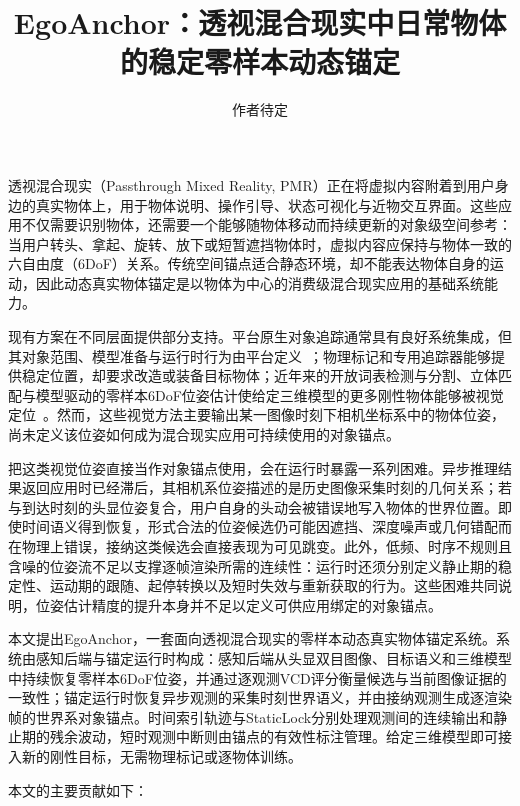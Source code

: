 \documentclass[review]{vgtc}
\title{EgoAnchor：透视混合现实中日常物体的稳定零样本动态锚定}
\author{作者待定}
\begin{document}
\label{sec:introduction}
\maketitle

透视混合现实（Passthrough Mixed Reality, PMR）正在将虚拟内容附着到用户身边的真实物体上，用于物体说明、操作引导、状态可视化与近物交互界面。这些应用不仅需要识别物体，还需要一个能够随物体移动而持续更新的对象级空间参考：当用户转头、拿起、旋转、放下或短暂遮挡物体时，虚拟内容应保持与物体一致的六自由度（6DoF）关系。传统空间锚点适合静态环境，却不能表达物体自身的运动，因此动态真实物体锚定是以物体为中心的消费级混合现实应用的基础系统能力。

现有方案在不同层面提供部分支持。平台原生对象追踪通常具有良好系统集成，但其对象范围、模型准备与运行时行为由平台定义~\cite{appleObjectAnchor,appleObjectTracking2026,azureObjectAnchors,metaDynamicObjectTracker}；物理标记和专用追踪器能够提供稳定位置，却要求改造或装备目标物体；近年来的开放词表检测与分割、立体匹配与模型驱动的零样本6DoF位姿估计使给定三维模型的更多刚性物体能够被视觉定位~\cite{foundationpose2023,megapose2022}。然而，这些视觉方法主要输出某一图像时刻下相机坐标系中的物体位姿，尚未定义该位姿如何成为混合现实应用可持续使用的对象锚点。

把这类视觉位姿直接当作对象锚点使用，会在运行时暴露一系列困难。异步推理结果返回应用时已经滞后，其相机系位姿描述的是历史图像采集时刻的几何关系；若与到达时刻的头显位姿复合，用户自身的头动会被错误地写入物体的世界位置。即使时间语义得到恢复，形式合法的位姿候选仍可能因遮挡、深度噪声或几何错配而在物理上错误，接纳这类候选会直接表现为可见跳变。此外，低频、时序不规则且含噪的位姿流不足以支撑逐帧渲染所需的连续性：运行时还须分别定义静止期的稳定性、运动期的跟随、起停转换以及短时失效与重新获取的行为。这些困难共同说明，位姿估计精度的提升本身并不足以定义可供应用绑定的对象锚点。

本文提出EgoAnchor，一套面向透视混合现实的零样本动态真实物体锚定系统。系统由感知后端与锚定运行时构成：感知后端从头显双目图像、目标语义和三维模型中持续恢复零样本6DoF位姿，并通过逐观测VCD评分衡量候选与当前图像证据的一致性；锚定运行时恢复异步观测的采集时刻世界语义，并由接纳观测生成逐渲染帧的世界系对象锚点。时间索引轨迹与StaticLock分别处理观测间的连续输出和静止期的残余波动，短时观测中断则由锚点的有效性标注管理。给定三维模型即可接入新的刚性目标，无需物理标记或逐物体训练。

本文的主要贡献如下：
\end{document}
